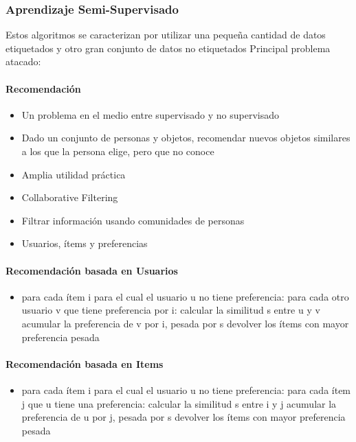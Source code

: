 \documentclass[a4paper,11pt,spanish]{book}
\begin{document}
      \subsubsection{Aprendizaje Semi-Supervisado}

	Estos algoritmos se caracterizan por utilizar una pequeña cantidad de datos etiquetados y otro gran conjunto de datos no etiquetados
	Principal problema atacado:
	\paragraph{Recomendación}
	  \begin{itemize}
	    \item Un problema en el medio entre supervisado y no supervisado
	    \item Dado un conjunto de personas y objetos, recomendar nuevos objetos similares a los que la persona elige, pero que no conoce
	    \item Amplia utilidad práctica
	    \item Collaborative Filtering
	    \item Filtrar información usando comunidades de personas
	    \item Usuarios, ítems y preferencias
	  \end{itemize}
	\paragraph {Recomendación basada en Usuarios}
	  \begin{itemize}
	    \item para cada ítem i para el cual el usuario u no tiene preferencia:
	      \subitem para cada otro usuario v que tiene preferencia por i:
		\subsubitem calcular la similitud s entre u y v
		\subsubitem acumular la preferencia de v por i, pesada por s
		\subsubitem devolver los ítems con mayor preferencia pesada
	  \end{itemize}
	\paragraph {Recomendación basada en Items}
	  \begin{itemize}
	    \item para cada ítem i para el cual el usuario u no tiene preferencia:
	      \subitem para cada ítem j que u tiene una preferencia:
		\subsubitem calcular la similitud s entre i y j
		\subsubitem acumular la preferencia de u por j, pesada por s
		\subsubitem devolver los ítems con mayor preferencia pesada
	  \end{itemize}
      
\end{document}
